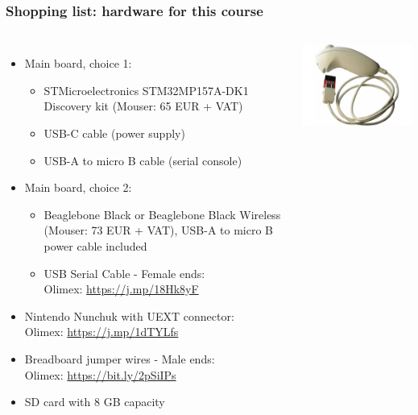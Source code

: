 \begin{frame}
\frametitle{Shopping list: hardware for this course}
  \begin{columns}
    \footnotesize
    \begin{itemize}
      \item Main board, choice 1:
      \begin{itemize}
        \item STMicroelectronics STM32MP157A-DK1 Discovery kit
        (Mouser: 65 EUR + VAT)
        \item USB-C cable (power supply)
        \item USB-A to micro B cable (serial console)
      \end{itemize}
      \item Main board, choice 2:
      \begin{itemize}
        \item Beaglebone Black or Beaglebone Black Wireless
        (Mouser: 73 EUR + VAT), USB-A to micro B power cable included
        \item USB Serial Cable - Female ends: \\
        Olimex: \url{https://j.mp/18Hk8yF}
      \end{itemize}
      \item Nintendo Nunchuk with UEXT connector: \\
            Olimex: \url{https://j.mp/1dTYLfs}
      \item Breadboard jumper wires - Male ends: \\
            Olimex: \url{https://bit.ly/2pSiIPs}
      \item SD card with 8 GB capacity
    \end{itemize}
    \includegraphics[height=0.25\textheight]{slides/kernel-shopping-list/nunchuk.jpg} \\
    \vspace{1cm}

\end{columns}
\end{frame}

